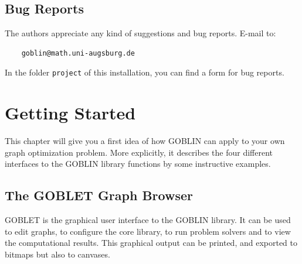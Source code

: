 \documentclass[a4paper,11pt,twoside]{book}
\begin{document}
\begin{multicols}{2}
\section{Bug Reports}

The authors appreciate any kind of suggestions and bug reports. E-mail to:
\begin{verbatim}
    goblin@math.uni-augsburg.de
\end{verbatim}
In the folder \verb/project/ of this installation, you can find a form for bug
reports.



\cleardoublepage
{}
\chapter{Getting Started}
\thispagestyle{fancy}

This chapter will give you a first idea of how GOBLIN can apply to your own
graph optimization problem. More explicitly, it describes the four different
interfaces to the GOBLIN library functions by some instructive examples.


\section{The GOBLET Graph Browser}
GOBLET is the graphical user interface to the GOBLIN library. It can be used
to edit graphs, to configure the core library, to run problem solvers and
to view the computational results. This graphical output can be printed, and
exported to bitmaps but also to canvases.


\end{multicols}
\end{document}
